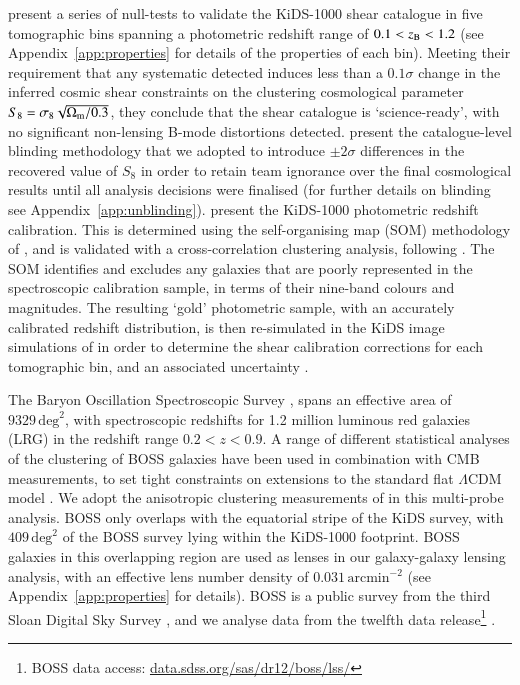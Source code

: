 \citet{giblin/etal:inprep} present a series of null-tests to validate the KiDS-1000 shear catalogue in five tomographic bins spanning a 
photometric redshift range of $0.1 < z_{\rm B} < 1.2$ (see Appendix~\ref{app:properties} for details of the properties of each bin).  
Meeting their requirement that any systematic detected induces less than a $0.1\sigma$ change in the inferred 
cosmic shear constraints on the clustering cosmological parameter $S_8 = \sigma_8\sqrt{\Omega_{\rm m}/0.3}$, they conclude that the shear catalogue is `science-ready', with no significant non-lensing B-mode distortions detected.  \citet{kuijken/etal:2015} present the catalogue-level blinding methodology that we adopted to introduce $\pm 2\sigma$ differences in the recovered value of $S_8$ in order
to retain team ignorance over the final cosmological results until all 
analysis decisions were finalised (for further details on blinding see Appendix~\ref{app:unblinding}).
\citet{hildebrandt/etal:inprep} present the KiDS-1000 photometric redshift calibration.  This is determined using the self-organising map (SOM) methodology of \citet{wright/etal:2020}, and is validated with a cross-correlation clustering analysis, following \citet{vandenbusch/etal:2020}.
The SOM identifies and excludes any galaxies that are poorly represented in the spectroscopic calibration sample, in terms of their nine-band colours and magnitudes. The resulting `gold' photometric sample, with an accurately calibrated redshift distribution, is then re-simulated in the KiDS image simulations of \citet{kannawadi/etal:2019} in order to determine the shear calibration corrections for each tomographic bin, and an associated uncertainty \citep[see][for full details]{giblin/etal:inprep,hildebrandt/etal:inprep}.
 
The Baryon Oscillation Spectroscopic Survey
\citep[BOSS,][]{alam/etal:2015}, spans an effective area of $9329\,\mathrm{deg}^{2}$, with spectroscopic redshifts for 1.2 million luminous red
galaxies (LRG) in the redshift range $0.2<z<0.9$.   A range of
different statistical analyses of the clustering of BOSS galaxies have been used in combination with CMB
measurements, to set tight constraints on extensions to the standard
flat $\Lambda$CDM model \citep[see][and references
therein]{alam/etal:2017}.   We adopt the anisotropic clustering
measurements of \citet{sanchez/etal:2017} in this multi-probe analysis.
BOSS only overlaps with the equatorial stripe
of the KiDS survey, with $409\,\mathrm{deg}^{2}$ of the BOSS survey lying within
the KiDS-1000 footprint.  BOSS galaxies in this overlapping region are used as lenses in
our galaxy-galaxy lensing analysis, with an effective lens number density of $0.031\,\mathrm{arcmin}^{-2}$ (see Appendix~\ref{app:properties} for details).  BOSS is a public survey from the third Sloan
Digital Sky Survey \citep{york/etal:2000}, and we analyse data from the twelfth data release\footnote{BOSS data access: \href{https://data.sdss.org/sas/dr12/boss/lss/}{data.sdss.org/sas/dr12/boss/lss/}} \citep[DR12,][]{alam/etal:2015}. 

